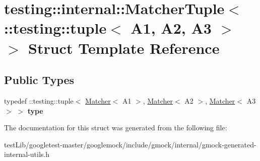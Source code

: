 \hypertarget{structtesting_1_1internal_1_1MatcherTuple_3_01_1_1testing_1_1tuple_3_01A1_00_01A2_00_01A3_01_4_01_4}{}\section{testing\+:\+:internal\+:\+:Matcher\+Tuple$<$ \+:\+:testing\+:\+:tuple$<$ A1, A2, A3 $>$ $>$ Struct Template Reference}
\label{structtesting_1_1internal_1_1MatcherTuple_3_01_1_1testing_1_1tuple_3_01A1_00_01A2_00_01A3_01_4_01_4}
\subsection*{Public Types}
\begin{DoxyCompactItemize}
\item 
\mbox{\label{structtesting_1_1internal_1_1MatcherTuple_3_01_1_1testing_1_1tuple_3_01A1_00_01A2_00_01A3_01_4_01_4_a14ce558da46f2d3829b2dfacdab2c980}} 
typedef \+::testing\+::tuple$<$ \hyperlink{classtesting_1_1Matcher}{Matcher}$<$ A1 $>$, \hyperlink{classtesting_1_1Matcher}{Matcher}$<$ A2 $>$, \hyperlink{classtesting_1_1Matcher}{Matcher}$<$ A3 $>$ $>$ {\bfseries type}
\end{DoxyCompactItemize}


The documentation for this struct was generated from the following file\+:\begin{DoxyCompactItemize}
\item 
test\+Lib/googletest-\/master/googlemock/include/gmock/internal/gmock-\/generated-\/internal-\/utils.\+h\end{DoxyCompactItemize}

